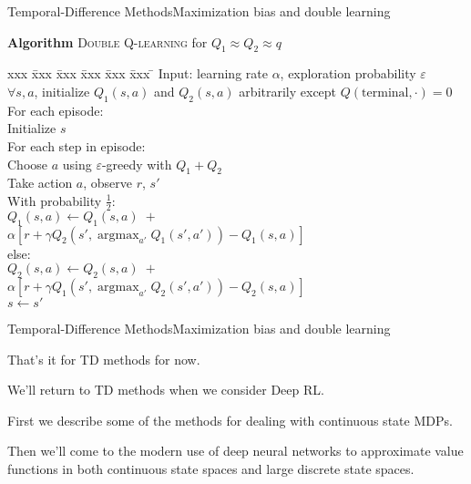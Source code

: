\documentclass{beamer}
\DeclareMathOperator*{\argmax}{argmax}
\begin{document}
\begin{frame}{Temporal-Difference Methods}{Maximization bias and double learning}

  \begin{block}{\textbf{Algorithm} \textsc{Double Q-learning} for $Q_1 \approx
      Q_2 \approx q$}
    \begin{tabbing}
      xxx \= xxx \= xxx \= xxx \= xxx \= xxx \= \kill
      Input: learning rate $\alpha$, exploration probability $\varepsilon$ \\
      $\forall s, a$, initialize $Q_1(s,a)$ and $Q_2(s,a)$ arbitrarily
      except $Q(\mathrm{terminal},\cdot) = 0$ \\
      For each episode: \\
      \> Initialize $s$ \\
      \> For each step in episode: \\
      \> \> Choose $a$ using $\varepsilon$-greedy with $Q_1+Q_2$ \\
      \> \> Take action $a$, observe $r$, $s'$ \\
      \> \> With probability $\frac{1}{2}$: \\
      \> \> \> $Q_1(s,a) \leftarrow Q_1(s,a) \; + $ \\
      \> \> \> \> \> \> $\alpha \left[ r + \gamma Q_2(s', \argmax_{a'} Q_1(s', a')) - Q_1(s, a) \right]$ \\
      \> \> else: \\
      \> \> \> $Q_2(s,a) \leftarrow Q_2(s,a) \; + $ \\
      \> \> \> \> \> \> $\alpha \left[ r + \gamma Q_1(s', \argmax_{a'} Q_2(s', a')) - Q_2(s, a) \right]$ \\
      \> \> $s \leftarrow s'$
    \end{tabbing}
  \end{block}

\end{frame}


\begin{frame}{Temporal-Difference Methods}{Maximization bias and double learning}

  That's it for TD methods for now.

  \medskip

  We'll return to TD methods when we consider Deep RL.

  \medskip

  First we describe
  some of the methods for dealing with continuous state MDPs.

  \medskip

  Then we'll come to the modern use of deep neural networks to
  approximate value functions
  in both continuous state spaces and large discrete state
  spaces.

\end{frame}
\end{document}
